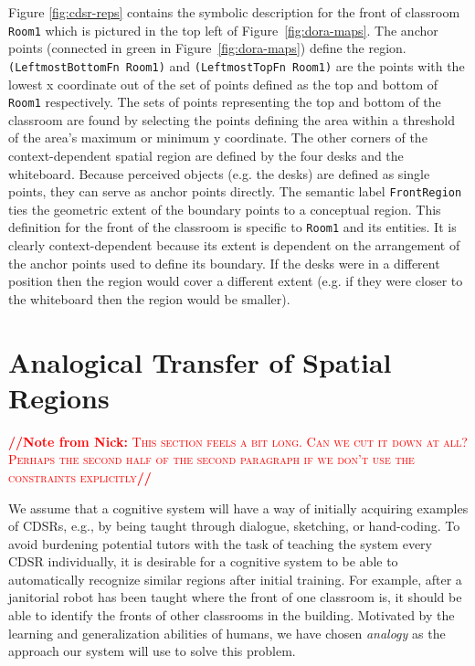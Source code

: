 \documentclass[letterpaper]{article}
\newcommand{\from}[2]{\textcolor{red}{\noindent\textbf{//}\textbf{Note
      from #1:}\textsc{ #2}\textbf{//}}}
\newcommand{\fw}[1]{\texttt{#1}}
\begin{document}
Figure \ref{fig:cdsr-reps} contains the symbolic description for the front of classroom \fw{Room1} which is pictured in the top left of Figure~\ref{fig:dora-maps}. The anchor points (connected in green in Figure~\ref{fig:dora-maps}) define the region. \fw{(LeftmostBottomFn Room1)} and \fw{(LeftmostTopFn Room1)} are the points with the lowest x coordinate out of the set of points defined as the top and bottom of \fw{Room1} respectively. The sets of points representing the top and bottom of the classroom are found by selecting the points defining the area within a threshold of the area's maximum or minimum y coordinate. The other corners of the context-dependent spatial region are defined by the four desks and the whiteboard. Because perceived objects (e.g. the desks) are defined as single points, they can serve as anchor points directly. The semantic label \fw{FrontRegion} ties the geometric extent of the boundary points to a conceptual region. This definition for the front of the classroom is specific to \fw{Room1} and its entities. It is clearly context-dependent because its extent is dependent on the arrangement of the anchor points used to define its boundary. If the desks were in a different position then the region would cover a different extent (e.g. if they were closer to the whiteboard then the region would be smaller). 



\section{Analogical Transfer of Spatial Regions}\label{sec:analogy}

\from{Nick}{This section feels a bit long. Can we cut it down at all? Perhaps the second half of the second paragraph if we don't use the constraints explicitly}

We assume that a cognitive system will have a way of initially acquiring examples of CDSRs, e.g., by being taught through dialogue, sketching, or hand-coding. To avoid burdening potential tutors with the task of teaching the system every CDSR individually, it is desirable for a cognitive system to be able to automatically recognize similar regions after initial training. For example, after a janitorial robot has been taught where the front of one classroom is, it should be able to identify the fronts of other classrooms in the building. Motivated by the learning and generalization abilities of humans, we have chosen \emph{analogy} as the approach our system will use to solve this problem.
\end{document}
